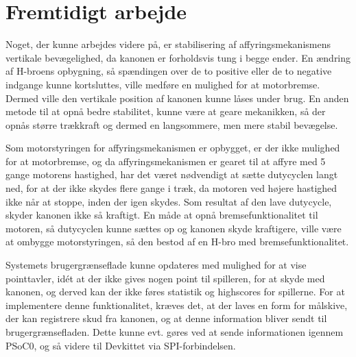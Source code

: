 \chapter{Fremtidigt arbejde}


Noget, der kunne arbejdes videre på, er stabilisering af affyringsmekanismens vertikale bevægelighed, da kanonen er forholdsvis tung i begge ender. En ændring af H-broens opbygning, så spændingen over de to positive eller de to negative indgange kunne kortsluttes, ville medføre en mulighed for at motorbremse. Dermed ville den vertikale position af kanonen kunne låses under brug. En anden metode til at opnå bedre stabilitet, kunne være at geare mekanikken, så der opnås større trækkraft og dermed en langsommere, men mere stabil bevægelse.\newline

\noindent Som motorstyringen for affyringsmekanismen er opbygget, er der ikke mulighed for at motorbremse, og da affyringsmekanismen er gearet til at affyre med 5 gange motorens hastighed, har det været nødvendigt at sætte dutycyclen langt ned, for at der ikke skydes flere gange i træk, da motoren ved højere hastighed ikke når at stoppe, inden der igen skydes. Som resultat af den lave dutycycle, skyder kanonen ikke så kraftigt. En måde at opnå bremsefunktionalitet til motoren, så dutycyclen kunne sættes op og kanonen skyde kraftigere, ville være at ombygge motorstyringen, så den bestod af en H-bro med bremsefunktionalitet. \newline

\noindent Systemets brugergrænseflade kunne opdateres med mulighed for at vise pointtavler, idét at der ikke gives nogen point til spilleren, for at skyde med kanonen, og derved kan der ikke føres statistik og highscores for spillerne. For at implementere denne funktionalitet, kræves det, at der laves en form for målskive, der kan registrere skud fra kanonen, og at denne information bliver sendt til brugergrænsefladen. Dette kunne evt. gøres ved at sende informationen igennem PSoC0, og så videre til Devkittet via SPI-forbindelsen. \newline

 
